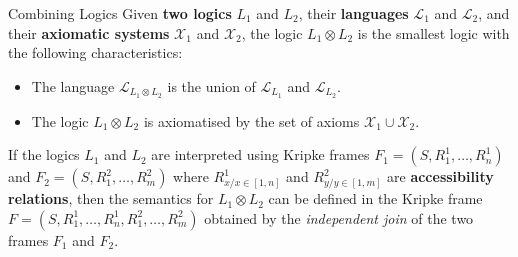 \documentclass{beamer}
\begin{document}
\begin{frame}{Combining Logics}
Given \textbf{two logics} $L_1$ and $L_2$, their \textbf{languages} $\mathcal{L}_1$ and $\mathcal{L}_2$, and their
\textbf{axiomatic systems} $\mathcal{X}_1$ and $\mathcal{X}_2$, the logic
$L_1 \otimes L_2$ is the smallest logic with the following
characteristics:
\begin{itemize}
  \item The language $\mathcal{L}_{L_1\otimes L_2}$ is the union of $\mathcal{L}_{L_1}$ and $\mathcal{L}_{L_2}$.
  \item The logic $L_1 \otimes L_2$ is axiomatised by the set of axioms $\mathcal{X}_1 \cup \mathcal{X}_2$.
\end{itemize}
If the logics $L_1$ and $L_2$ are interpreted using Kripke frames
$F_1 = (S, R_1^1, \dots, R_n^1)$ and $F_2 = (S, R_1^2, \dots
,R_m^2 )$ where $R^1_{x/x\in[1,n]}$ and $R^2_{y/y\in[1,m]}$ are
\textbf{accessibility relations}, then the semantics for $L_1 \otimes L_2$
can be defined in the Kripke frame $F =(S, R_1^1, \dots , R_n^1,
R_1^2, \dots ,R_m^2 )$ obtained by the \textit{independent join} of the two
frames $F_1$ and $F_2$.
    \end{frame}
\end{document}
